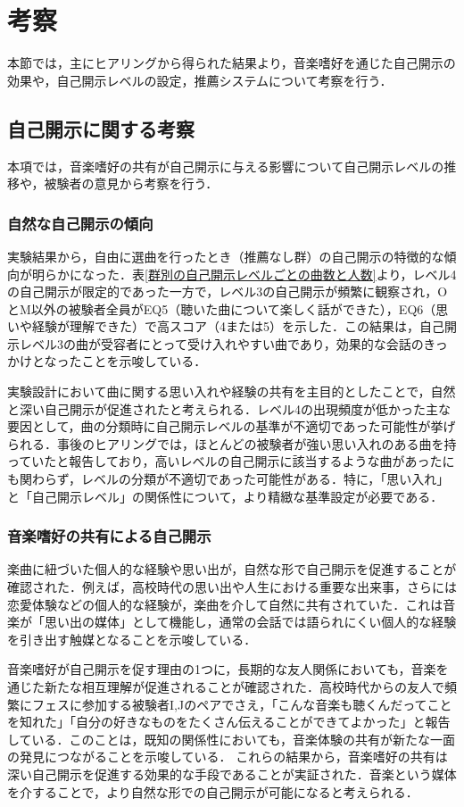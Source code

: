 \section{考察}

本節では，主にヒアリングから得られた結果より，音楽嗜好を通じた自己開示の効果や，自己開示レベルの設定，推薦システムについて考察を行う．

\subsection{自己開示に関する考察}

本項では，音楽嗜好の共有が自己開示に与える影響について自己開示レベルの推移や，被験者の意見から考察を行う．

\subsubsection{自然な自己開示の傾向}
実験結果から，自由に選曲を行ったとき（推薦なし群）の自己開示の特徴的な傾向が明らかになった．表\ref{群別の自己開示レベルごとの曲数と人数}より，レベル4の自己開示が限定的であった一方で，レベル3の自己開示が頻繁に観察され，OとM以外の被験者全員がEQ5（聴いた曲について楽しく話ができた），EQ6（思いや経験が理解できた）で高スコア（4または5）を示した．この結果は，自己開示レベル3の曲が受容者にとって受け入れやすい曲であり，効果的な会話のきっかけとなったことを示唆している．

実験設計において曲に関する思い入れや経験の共有を主目的としたことで，自然と深い自己開示が促進されたと考えられる．レベル4の出現頻度が低かった主な要因として，曲の分類時に自己開示レベルの基準が不適切であった可能性が挙げられる．事後のヒアリングでは，ほとんどの被験者が強い思い入れのある曲を持っていたと報告しており，高いレベルの自己開示に該当するような曲があったにも関わらず，レベルの分類が不適切であった可能性がある．特に，「思い入れ」と「自己開示レベル」の関係性について，より精緻な基準設定が必要である．


\subsubsection{音楽嗜好の共有による自己開示}
楽曲に紐づいた個人的な経験や思い出が，自然な形で自己開示を促進することが確認された．例えば，高校時代の思い出や人生における重要な出来事，さらには恋愛体験などの個人的な経験が，楽曲を介して自然に共有されていた．これは音楽が「思い出の媒体」として機能し，通常の会話では語られにくい個人的な経験を引き出す触媒となることを示唆している．

音楽嗜好が自己開示を促す理由の1つに，長期的な友人関係においても，音楽を通じた新たな相互理解が促進されることが確認された．高校時代からの友人で頻繁にフェスに参加する被験者I,Jのペアでさえ，「こんな音楽も聴くんだってことを知れた」「自分の好きなものをたくさん伝えることができてよかった」と報告している．このことは，既知の関係性においても，音楽体験の共有が新たな一面の発見につながることを示唆している．
これらの結果から，音楽嗜好の共有は深い自己開示を促進する効果的な手段であることが実証された．音楽という媒体を介することで，より自然な形での自己開示が可能になると考えられる．



